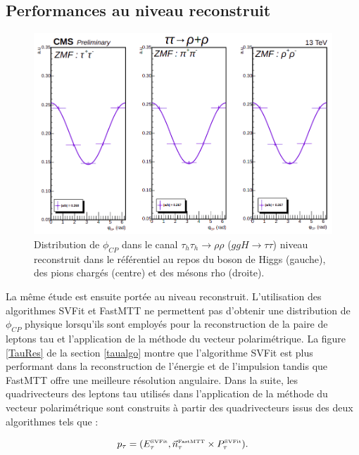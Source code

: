 

\subsection{Performances au niveau reconstruit}

\begin{figure}[!ht]
    \centering
    \includegraphics[scale=0.37]{Chapitre6/Images/ZMFreco.png} 
  \caption{Distribution de $\phi_{CP}$ dans le canal $\tau_h\tau_h\rightarrow\rho\rho$ ($ggH\to\tau\tau$) niveau reconstruit dans le référentiel au repos du boson de Higgs (gauche), des pions chargés (centre) et des mésons rho (droite).}
  \label{ZMFreco}
\end{figure}

La même étude est ensuite portée au niveau reconstruit. L'utilisation des algorithmes SVFit et FastMTT ne permettent pas d'obtenir une distribution de $\phi_{CP}$ physique lorsqu'ils sont employés pour la reconstruction de la paire de leptons tau et l'application de la méthode du vecteur polarimétrique. La figure \ref{TauRes} de la section \ref{taualgo} montre que l'algorithme SVFit est plus performant dans la reconstruction de l'énergie et de l'impulsion tandis que FastMTT offre une meilleure résolution angulaire. Dans la suite, les quadrivecteurs des leptons tau utilisés dans l'application de la méthode du vecteur polarimétrique sont construits à partir des quadrivecteurs issus des deux algorithmes tels que :  

\begin{equation}
    p_{\tau} = (E^{\text{\tiny SVFit}}_{\tau},\vec{n}_{\tau}^{\text{\tiny FastMTT}}\times P^{\text{\tiny SVFit}}_{\tau}).
\end{equation}

